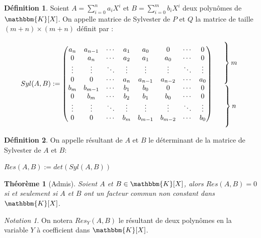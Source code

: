 \documentclass[12pt]{article}
\newcommand{\K}{\mathbbm{K}}
\newtheorem{thm}{Théorème}
\theoremstyle{definition}\newtheorem{defn}{Définition}
\theoremstyle{definition}\newtheorem{exm}{Exemple}
\theoremstyle{definition}\newtheorem{rem}{Remarque}
\theoremstyle{definition}\newtheorem{algo}{Algorithme}
\theoremstyle{remark}\newtheorem{exo}{Exercice}
\theoremstyle{remark}\newtheorem{nota}{Notation}
\begin{document}
\begin{defn}
Soient $A = \displaystyle\sum_{i=0}^n a_iX^i$ et $B = \displaystyle\sum_{i=0}^m b_iX^i$ deux polynômes de $\K[X]$. On appelle matrice de Sylvester de $P$ et $Q$ la matrice de taille $(m+n)\times(m+n)$ définit par :
\begin{center}
$$\begin{array}{cc} 
Syl(A,B) :=
   \begin{pmatrix} 
a_n & a_{n-1} & \cdots & a_1 & a_0 & 0 & \cdots & 0 \\
0 & a_n & \cdots & a_2 & a_1	 & a_0 & \cdots & 0 \\
\vdots & \vdots & \ddots & \vdots & \vdots & \vdots & \ddots & \vdots\\
0 & 0 & \cdots & a_n & a_{n-1} & a_{n-2} & \cdots & a_0 \\
b_m & b_{m-1} & \cdots & b_1 & b_0 & 0 & \cdots & 0 \\
0 & b_m & \cdots & b_2 & b_1	 & b_0 & \cdots & 0 \\
\vdots & \vdots & \ddots & \vdots & \vdots & \vdots & \ddots & \vdots\\
0 & 0 & \cdots & b_m & b_{m-1} & b_{m-2} & \cdots & b_0 \\
   \end{pmatrix} 
&  \begin{array}{c} 
      \left. \rule{0pt}{12mm} \right\} m \\
      \left. \rule{0pt}{12mm} \right\} n 
   \end{array} 
\end{array}$$
\end{center}
\end{defn}

\begin{defn}
On appelle résultant de $A$ et $B$ le déterminant de la matrice de Sylvester de $A$ et $B$:
\begin{center} $Res(A,B) := det(Syl(A,B))$ \end{center}
\end{defn}

\begin{thm}[Admis]
Soient $A$ et $B \in \K[X]$, alors $Res(A,B) = 0$ si et seulement si $A$ et $B$ ont un facteur commun non constant dans $\K[X]$.
\end{thm}

\begin{nota}
On notera $Res_Y(A,B)$ le résultant de deux polynômes en la variable $Y$ à coefficient dans $\K[X]$.
\end{nota}
\end{document}
